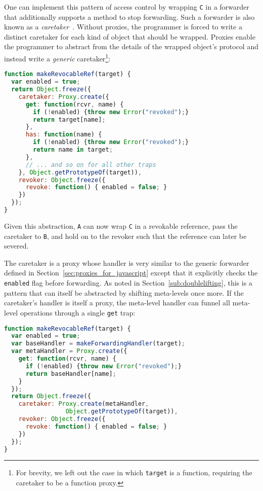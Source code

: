 \documentclass{acm_proc_article-sp}
\begin{document}
One can implement this pattern of access control by wrapping \texttt{C} in a forwarder that additionally supports a method to stop forwarding. Such a forwarder is also known as a \emph{caretaker}~\cite{robust_composition}. Without proxies, the programmer is forced to write a distinct caretaker for each kind of object that should be wrapped. Proxies enable the programmer to abstract from the details of the wrapped object's protocol and instead write a \emph{generic} caretaker\footnote{For brevity, we left out the case in which \texttt{target} is a function, requiring the caretaker to be a function proxy.}:

\begin{lstlisting}[language=javascript]
function makeRevocableRef(target) {
  var enabled = true;
  return Object.freeze({
    caretaker: Proxy.create({
      get: function(rcvr, name) {
        if (!enabled) {throw new Error("revoked");}
        return target[name];
      },
      has: function(name) {
        if (!enabled) {throw new Error("revoked");}
        return name in target;      
      },
      // ... and so on for all other traps
    }, Object.getPrototypeOf(target)),
    revoker: Object.freeze({
      revoke: function() { enabled = false; }
    })
  });
}
\end{lstlisting}

Given this abstraction, \texttt{A} can now wrap \texttt{C} in a revokable reference, pass the caretaker to \texttt{B}, and hold on to the revoker such that the reference can later be severed.

The caretaker is a proxy whose handler is very similar to the generic forwarder defined in Section~\ref{sec:proxies_for_javascript} except that it explicitly checks the \texttt{enabled} flag before forwarding. As noted in Section~\ref{sub:doublelifting}, this is a pattern that can itself be abstracted by shifting meta-levels once more. If the caretaker's handler is itself a proxy, the meta-level handler can funnel all meta-level operations through a single \texttt{get} trap:

\begin{lstlisting}[language=javascript]
function makeRevocableRef(target) {
  var enabled = true;
  var baseHandler = makeForwardingHandler(target);
  var metaHandler = Proxy.create({
    get: function(rcvr, name) {
      if (!enabled) {throw new Error("revoked");}
      return baseHandler[name];
    }
  });
  return Object.freeze({
    caretaker: Proxy.create(metaHandler, 
                 Object.getPrototypeOf(target)),
    revoker: Object.freeze({
      revoke: function() { enabled = false; }
    })
  });
}
\end{lstlisting}
\end{document}
